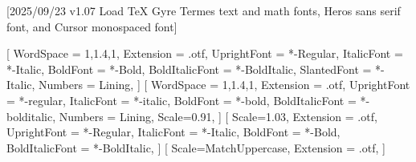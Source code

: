
[2025/09/23 v1.07 Load TeX Gyre Termes text and math fonts, Heros sans serif font, and Cursor monospaced font]

%
%
\ifpdftex
	\RequirePackage[T1]{fontenc}	
	\RequirePackage{bm}
\else
    \RequirePackage[warnings-off={mathtools-colon,mathtools-overbracket},mathbf=sym]{unicode-math}
    \setmainfont{TeXGyreTermesX}[
		WordSpace = {1,1.4,1},
    	Extension = .otf,
    	UprightFont = *-Regular,
    	ItalicFont = *-Italic,
    	BoldFont = *-Bold,
    	BoldItalicFont = *-BoldItalic,
		SlantedFont = *-Italic,
		Numbers = Lining,
	]
    \setsansfont{texgyreheros}[
		WordSpace = {1,1.4,1},
		Extension = .otf,
    	UprightFont = *-regular,
    	ItalicFont = *-italic,
    	BoldFont = *-bold,
    	BoldItalicFont = *-bolditalic,
		Numbers = Lining,
    	Scale=0.91,%
	]        
   \setmonofont{texgyrecursor}[
        Scale=1.03, %
        Extension = .otf,
        UprightFont = *-Regular,
        ItalicFont = *-Italic,
        BoldFont = *-Bold, 
    	BoldItalicFont = *-BoldItalic,
    ]             
    [
    	Scale=MatchUppercase,
    	Extension = .otf,
    ]
    \newcommand*{\FRAC}[1]{{\addfontfeature{Fractions=On}#1}}%
\fi